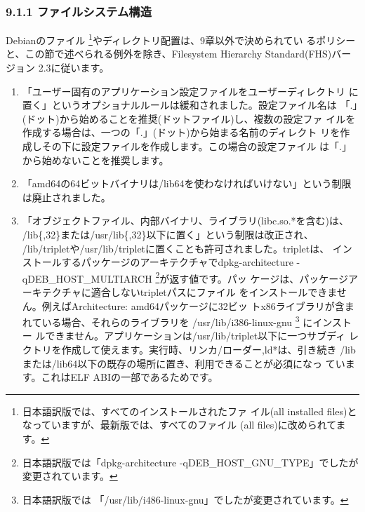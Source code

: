 \documentclass[mingoth,a4paper]{jsarticle}
\begin{document}
\subsubsection{9.1.1 ファイルシステム構造}

Debianのファイル \footnote{日本語訳版では、すべてのインストールされたファ
イル(all installed files)となっていますが、最新版では、すべてのファイル
(all files)に改められてます。}やディレクトリ配置は、9章以外で決められてい
るポリシーと、この節で述べられる例外を除き、Filesystem Hierarchy
Standard(FHS)バージョン 2.3に従います。

\begin{enumerate}
\item 「ユーザー固有のアプリケーション設定ファイルをユーザーディレクトリ
      に置く」というオプショナルルールは緩和されました。設定ファイル名は
      「.」(ドット)から始めることを推奨(ドットファイル)し、複数の設定ファ
      イルを作成する場合は、一つの「.」(ドット)から始まる名前のディレクト
      リを作成しその下に設定ファイルを作成します。この場合の設定ファイル
      は「.」から始めないことを推奨します。
\item 「amd64の64ビットバイナリは/lib64を使わなければいけない」という制限
      は廃止されました。

\item 「オブジェクトファイル、内部バイナリ、ライブラリ(libc.so.*を含む)は、
      /lib\{,32\}または/usr/lib\{,32\}以下に置く」という制限は改正され、
      /lib/tripletや/usr/lib/tripletに置くことも許可されました。tripletは、
      インストールするパッケージのアーキテクチャでdpkg-architecture
      -qDEB\_HOST\_MULTIARCH \footnote{日本語訳版では「dpkg-architecture
      -qDEB\_HOST\_GNU\_TYPE」でしたが変更されています。}が返す値です。パッ
      ケージは、パッケージアーキテクチャに適合しないtripletパスにファイル
      をインストールできません。例えばArchitecture: amd64パッケージに32ビッ
      トx86ライブラリが含まれている場合、それらのライブラリを
      /usr/lib/i386-linux-gnu \footnote{日本語訳版では
      「/usr/lib/i486-linux-gnu」でしたが変更されています。} にインストー
      ルできません。アプリケーションは/usr/lib/triplet以下に一つサブディ
      レクトリを作成して使えます。実行時、リンカ/ローダー,ld*は、引き続き
      /libまたは/lib64以下の既存の場所に置き、利用できることが必須になっ
      ています。これはELF ABIの一部であるためです。


\end{enumerate}
\end{document}
